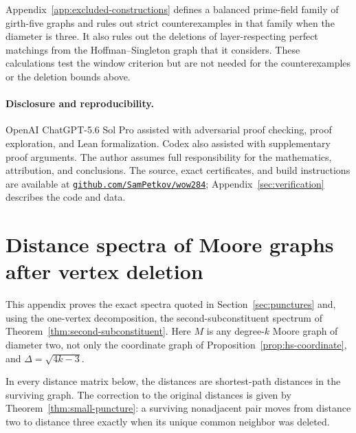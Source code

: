 \documentclass[a4paper,10pt,reqno]{amsart}
\theoremstyle{plain}
\theoremstyle{definition}
\theoremstyle{remark}
\begin{document}
Appendix~\ref{app:excluded-constructions} defines a balanced prime-field
family of girth-five graphs and rules out strict counterexamples in that
family when the diameter is three. It also rules out the deletions of
layer-respecting perfect matchings from the Hoffman--Singleton graph that it
considers.  These calculations test the
window criterion but are not needed for the counterexamples or the deletion
bounds above.

\paragraph{Disclosure and reproducibility.}
OpenAI ChatGPT-5.6 Sol Pro assisted with adversarial proof checking, proof
exploration, and Lean formalization. Codex also assisted with supplementary
proof arguments.  The author assumes full responsibility
for the mathematics, attribution, and conclusions.  The source, exact
certificates, and build instructions are available at
\href{https://github.com/SamPetkov/wow284}{\texttt{github.com/SamPetkov/wow284}};
Appendix~\ref{sec:verification} describes the code and data.

\begingroup
\footnotesize
\setlength{\bibsep}{0pt}
\renewcommand{\bibsection}{\section*{References}}


\endgroup

\appendix

\section{Distance spectra of Moore graphs after vertex deletion}
\label{app:small-deletion-spectra}

This appendix proves the exact spectra quoted in Section~\ref{sec:punctures}
and, using the one-vertex decomposition, the second-subconstituent spectrum
of Theorem~\ref{thm:second-subconstituent}.
Here \(M\) is any degree-\(k\) Moore graph of diameter two, not only the
coordinate graph of Proposition~\ref{prop:hs-coordinate}, and
\(\Delta=\sqrt{4k-3}\).

In every distance matrix below, the distances are shortest-path distances
in the surviving graph. The correction to the original distances is given by
Theorem~\ref{thm:small-puncture}:
a surviving nonadjacent pair moves from distance two to distance three
exactly when its unique common neighbor was deleted.
\end{document}
